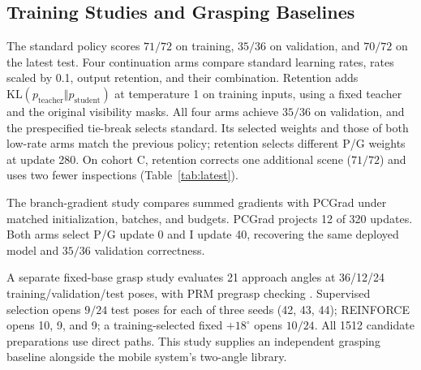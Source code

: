 \subsection{Training Studies and Grasping Baselines}
\label{sec:exploratory}
The standard policy scores $71/72$ on training, $35/36$ on validation, and
$70/72$ on the latest test. Four continuation arms compare
standard learning rates, rates scaled by 0.1, output retention, and their
combination. Retention adds
$\mathrm{KL}(p_{\mathrm{teacher}}\Vert p_{\mathrm{student}})$ at temperature
1 on training inputs, using a fixed teacher and the original visibility masks.
All four arms achieve $35/36$ on validation, and the prespecified tie-break
selects standard. Its selected weights and those of both low-rate arms match
the previous policy; retention selects
different P/G weights at update 280. On cohort C, retention corrects one additional
scene ($71/72$) and uses two fewer inspections (Table~\ref{tab:latest}).

The branch-gradient study compares summed gradients with PCGrad
\citep{yu2020pcgrad} under matched initialization, batches, and budgets. PCGrad
projects 12 of 320 updates. Both arms select P/G update 0 and I update 40,
recovering the same deployed model and $35/36$ validation correctness.

A separate fixed-base grasp study evaluates 21 approach angles at 36/12/24
training/validation/test poses, with PRM pregrasp checking
\citep{kavraki1996prm}. Supervised selection opens $9/24$ test poses for each
of three seeds (42, 43, 44); REINFORCE \citep{williams1992reinforce} opens
10, 9, and 9; a training-selected fixed $+18^\circ$ opens $10/24$.
All 1512 candidate preparations use direct paths. This study supplies an
independent grasping baseline alongside the mobile system's two-angle library.
